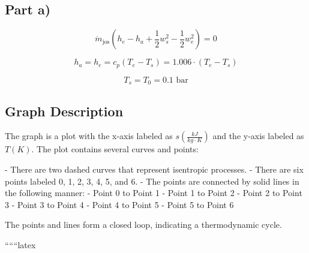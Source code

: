 \subsection*{Part a)}

\begin{equation*}
\dot{m}_{\text{jos}} \left( h_e - h_a + \frac{1}{2} w_s^2 - \frac{1}{2} w_e^2 \right) = 0
\end{equation*}

\begin{equation*}
h_a = h_e = c_p (T_e - T_s) = 1.006 \cdot (T_e - T_s)
\end{equation*}

\begin{equation*}
T_s = T_0 = 0.1 \text{ bar}
\end{equation*}

\subsection*{Graph Description}

The graph is a plot with the x-axis labeled as \( s \left( \frac{kJ}{kg \cdot K} \right) \) and the y-axis labeled as \( T (K) \). The plot contains several curves and points:

- There are two dashed curves that represent isentropic processes.
- There are six points labeled 0, 1, 2, 3, 4, 5, and 6.
- The points are connected by solid lines in the following manner:
  - Point 0 to Point 1
  - Point 1 to Point 2
  - Point 2 to Point 3
  - Point 3 to Point 4
  - Point 4 to Point 5
  - Point 5 to Point 6

The points and lines form a closed loop, indicating a thermodynamic cycle.

``````latex
